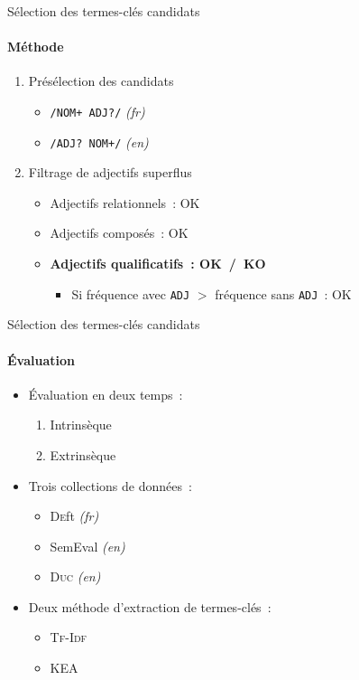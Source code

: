\begin{frame}{Sélection des termes-clés candidats}\framesubtitle{Méthode}
  \begin{enumerate}
    \item{Présélection des candidats}
    \begin{itemize}
      \item{\texttt{/NOM+ ADJ?/} \textit{(fr)}}
      \item{\texttt{/ADJ? NOM+/} \textit{(en)}}
    \end{itemize}
    \item{Filtrage de adjectifs superflus}
    \begin{itemize}
      \item{Adjectifs relationnels~: OK}
      \item{Adjectifs composés~: OK}
      \item{\textbf{Adjectifs qualificatifs~: OK~/~KO}}
      \begin{itemize}
        \item{Si fréquence avec \texttt{ADJ} $>$ fréquence sans
                  \texttt{ADJ}~: OK}
      \end{itemize}
    \end{itemize}
  \end{enumerate}
\end{frame}

\begin{frame}{Sélection des termes-clés candidats}\framesubtitle{Évaluation}
  \begin{itemize}
    \item{Évaluation en deux temps~:}
    \begin{enumerate}
      \item{Intrinsèque}
      \item{Extrinsèque}
    \end{enumerate}
    \item{Trois collections de données~:}
    \begin{itemize}
      \item{\textsc{De}ft \textit{(fr)}}
      \item{SemEval \textit{(en)}}
      \item{\textsc{Duc} \textit{(en)}}
    \end{itemize}
    \item{Deux méthode d'extraction de termes-clés~:}
    \begin{itemize}
      \item{\textsc{Tf-Idf}}
      \item{KEA}
    \end{itemize}
  \end{itemize}
\end{frame}

